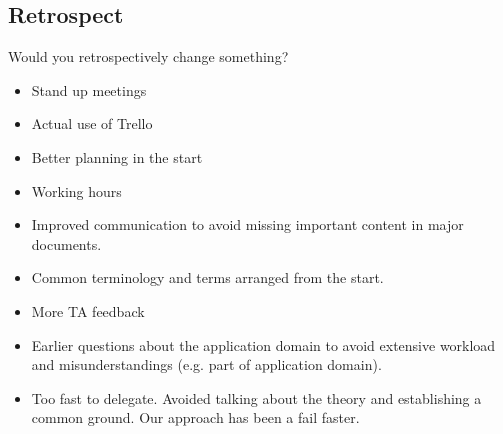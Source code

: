 \subsection{Retrospect}

Would you retrospectively change something?

\begin{itemize}
	\item Stand up meetings
	\item Actual use of Trello
	\item Better planning in the start
	\item Working hours 
	\item Improved communication to avoid missing important content in major documents.
	\item Common terminology and terms arranged from the start. 
	\item More TA feedback 
	\item Earlier questions about the application domain to avoid extensive workload and misunderstandings (e.g. part of application domain). 
	\item Too fast to delegate. Avoided talking about the theory and establishing a common ground. Our approach has been a fail faster.
\end{itemize}
